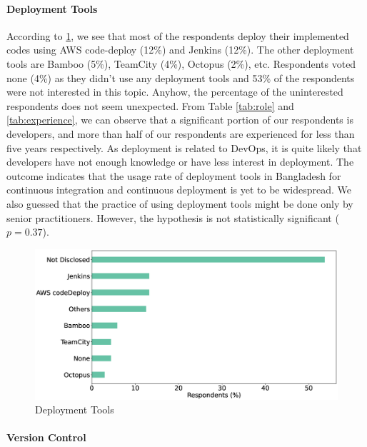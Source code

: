 \paragraph{Deployment Tools}
According to \ref{fig:deployTools}, we see that most of the respondents deploy their implemented codes using AWS code-deploy (12\%) and Jenkins (12\%). The other deployment tools are Bamboo (5\%), TeamCity (4\%), Octopus (2\%), etc. Respondents voted none (4\%) as they didn't use any deployment tools and 53\% of the respondents were not interested in this topic. Anyhow, the percentage of the uninterested respondents does not seem unexpected. From Table \ref{tab:role} and \ref{tab:experience}, we can observe that a significant portion of our respondents is developers, and more than half of our respondents are experienced for less than five years respectively. As deployment is related to DevOps, it is quite likely that developers have not enough knowledge or have less interest in deployment.   The outcome indicates that the usage rate of deployment tools in Bangladesh for continuous integration and continuous deployment is yet to be widespread. We also guessed that the practice of using deployment tools might be done only by senior practitioners. However, the hypothesis is not statistically significant ($p=0.37$).

\begin{figure}[h]
\centering
  \includegraphics[scale=0.18]{Figures/Respondents_deployment_tools}
  \caption{Deployment Tools}
  \label{fig:deployTools}
\end{figure}


\paragraph{Version Control}

